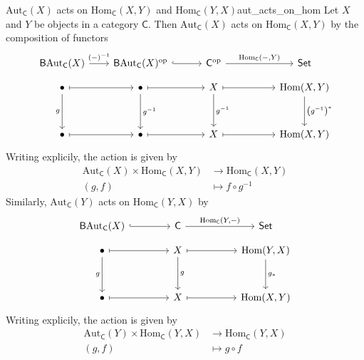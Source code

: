 \begin{example}{$\mathrm{Aut}_\mathsf{C}(X)$ acts on $\mathrm{Hom}_\mathsf{C}(X,Y)$ and $\mathrm{Hom}_\mathsf{C}(Y,X)$}{aut_acts_on_hom}
    Let $X$ and $Y$ be objects in a category $\mathsf{C}$. Then $\mathrm{Aut}_\mathsf{C}(X)$ acts on $\mathrm{Hom}_\mathsf{C}(X,Y)$ by the composition of functors
    \[
        \begin{tikzcd}[ampersand replacement=\&, column sep=5em, row sep=3em]
            \mathsf{B}\mathrm{Aut}_\mathsf{C}(X)\arrow[r,"{(-)}^{-1}"] \&[-3em] \mathsf{B}\mathrm{Aut}_\mathsf{C}(X)^{\mathrm{op}} \arrow[r, hook] \&[-2em] \mathsf{C}^{\mathrm{op}} \arrow[r, "{\mathrm{Hom}_{\mathsf{C}}(-,Y)}"] \& \mathsf{Set}\\[-2.3em]
            \bullet \arrow[r, maps to] \arrow[d, "g"']           \& \bullet \arrow[r, maps to] \arrow[d, "g^{-1}"]                           \& X \arrow[d, "g^{-1}"] \arrow[r, maps to]                               \& {\mathrm{Hom}(X,Y)} \arrow[d, "\left(g^{-1}\right)^*"] \\
            \bullet \arrow[r, maps to]                           \& \bullet \arrow[r, maps to]                                               \& X \arrow[r, maps to]                                                   \& {\mathrm{Hom}(X,Y)}
        \end{tikzcd}
    \]
    Writing explicily, the action is given by
    \begin{align*}
        \mathrm{Aut}_\mathsf{C}(X)\times \mathrm{Hom}_\mathsf{C}(X,Y) & \longrightarrow \mathrm{Hom}_\mathsf{C}(X,Y) \\
        (g,f)                                                         & \longmapsto f\circ g^{-1}
    \end{align*}
    Similarly, $\mathrm{Aut}_\mathsf{C}(Y)$ acts on $\mathrm{Hom}_\mathsf{C}(Y,X)$ by
    \[
        \begin{tikzcd}[ampersand replacement=\&, column sep=5em, row sep=3em]
            \mathsf{B}\mathrm{Aut}_\mathsf{C}(X)\arrow[r, hook] \&[-1em] \mathsf{C} \arrow[r, "{\mathrm{Hom}_{\mathsf{C}}(Y,-)}"] \& \mathsf{Set}\\[-2.3em]
            \bullet \arrow[r, maps to] \arrow[d, "g"']           \&  X \arrow[d, "g"] \arrow[r, maps to]                               \& {\mathrm{Hom}(Y,X)} \arrow[d, "g_*"] \\
            \bullet \arrow[r, maps to]                           \& X \arrow[r, maps to]                                                   \& {\mathrm{Hom}(X,Y)}
        \end{tikzcd}
    \]
    Writing explicily, the action is given by
    \begin{align*}
        \mathrm{Aut}_\mathsf{C}(Y)\times \mathrm{Hom}_\mathsf{C}(Y,X) & \longrightarrow \mathrm{Hom}_\mathsf{C}(Y,X) \\
        (g,f)                                                         & \longmapsto g\circ f
    \end{align*}
\end{example}

